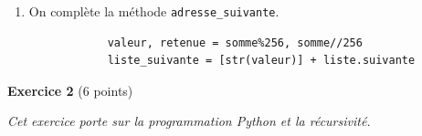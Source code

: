 \documentclass[11pt,a4paper]{article}
\newcommand{\mip}[1]{\texttt{#1}}
\begin{document}
\begin{enumerate}[resume]
\begin{verbatim}
        for i in range(4):
            # Opération booléenne :
            tmp.append(ip[i] & crible[i])
        return ".".join([str(k) for k in tmp])
\end{verbatim}

\item On complète la méthode \mip{adresse_suivante}.



\begin{verbatim}
            valeur, retenue = somme%256, somme//256
            liste_suivante = [str(valeur)] + liste.suivante
\end{verbatim}




\end{enumerate}

\bigskip

\textbf{Exercice 2} (6 points)


\medskip

\textit{Cet exercice porte sur la programmation Python et la récursivité.}

\medskip
\end{document}

